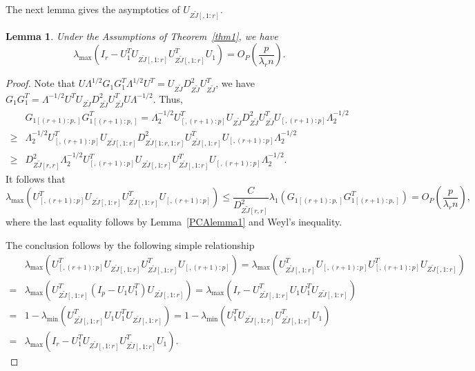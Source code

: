 \documentclass[review]{elsarticle}
\theoremstyle{plain}
\newtheorem{lemma}{Lemma}
\theoremstyle{definition}
\theoremstyle{remark}
\begin{document}
The next lemma gives the asymptotics of $U_{Z\tilde{J}[,1:r]}$.
\begin{lemma}\label{PCAlemma2}
    Under the Assumptions of Theorem~\ref{thm1}, we have
$$
\lambda_{\max}(I_r-U_1^T U_{Z\tilde{J}[,1:r]}U_{Z\tilde{J}[,1:r]}^T U_1)
=O_P(\frac{ p}{\lambda_r n}).
$$
\end{lemma}
\begin{proof}
    Note that
$
U\Lambda^{1/2} G_1 G_1^T \Lambda^{1/2} U^T 
=U_{Z\tilde{J}}D_{Z\tilde{J}}^2 U_{Z\tilde{J}}^T
$,
we have
$
G_1 G_1^T  
=\Lambda^{-1/2} U^T U_{Z\tilde{J}}D_{Z\tilde{J}}^2 U_{Z\tilde{J}}^TU\Lambda^{-1/2}
$. Thus,
$$
\begin{aligned}
&G_{1[(r+1):p,]} G_{1[(r+1):p,]}^T  
=\Lambda_{2}^{-1/2} U_{[,(r+1):p]}^T U_{Z\tilde{J}}D_{Z\tilde{J}}^2 U_{Z\tilde{J}}^T U_{[,(r+1):p]}\Lambda_{2}^{-1/2}\\
\geq&
\Lambda_{2}^{-1/2} U_{[,(r+1):p]}^T U_{Z\tilde{J}[,1:r]}D_{Z\tilde{J}[1:r,1:r]}^2 U_{Z\tilde{J}[,1:r]}^T U_{[,(r+1):p]}\Lambda_{2}^{-1/2}\\
\geq&
D_{Z\tilde{J}[r,r]}^2
\Lambda_{2}^{-1/2} U_{[,(r+1):p]}^T U_{Z\tilde{J}[,1:r]} U_{Z\tilde{J}[,1:r]}^T U_{[,(r+1):p]}\Lambda_{2}^{-1/2}.
\end{aligned}
$$
It follows that
$$
\lambda_{\max}(U_{[,(r+1):p]}^T U_{Z\tilde{J}[,1:r]} U_{Z\tilde{J}[,1:r]}^T U_{[,(r+1):p]})\leq
\frac{C}{D^2_{Z\tilde{J}[r,r]}} \lambda_{1}
(G_{1[(r+1):p,]} G_{1[(r+1):p,]}^T)
=O_P(\frac{p}{\lambda_r n}),
$$
    where the last equality follows by Lemma~\ref{PCAlemma1} and Weyl's inequality.

 The conclusion follows by the following simple relationship
$$
\begin{aligned}
&\lambda_{\max}(U_{[,(r+1):p]}^T U_{Z\tilde{J}[,1:r]} U_{Z\tilde{J}[,1:r]}^T U_{[,(r+1):p]})
=
\lambda_{\max}( U_{Z\tilde{J}[,1:r]}^T U_{[,(r+1):p]}U_{[,(r+1):p]}^T U_{Z\tilde{J}[,1:r]})\\
=&
\lambda_{\max}( U_{Z\tilde{J}[,1:r]}^T (I_p- U_1 U_1^T) U_{Z\tilde{J}[,1:r]})=
\lambda_{\max}(I_r- U_{Z\tilde{J}[,1:r]}^T  U_1 U_1^T U_{Z\tilde{J}[,1:r]})\\
=&
1-\lambda_{\min}( U_{Z\tilde{J}[,1:r]}^T  U_1 U_1^T U_{Z\tilde{J}[,1:r]})
=
1-\lambda_{\min}(U_1^T U_{Z\tilde{J}[,1:r]}U_{Z\tilde{J}[,1:r]}^T U_1)\\
=&
\lambda_{\max}(I_r-U_1^T U_{Z\tilde{J}[,1:r]}U_{Z\tilde{J}[,1:r]}^T U_1).
\end{aligned}
$$
\end{proof}
\end{document}
